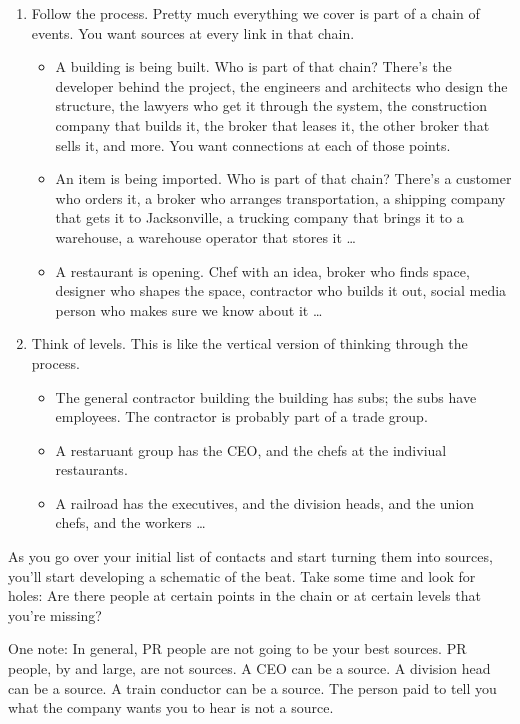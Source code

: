 \documentclass[
  11pt,
  american,
  letterpaperpaper,
  extrafontsizes,onecolumn,openright
  ]{memoir}
\providecommand{\tightlist}{%
  \setlength{\itemsep}{0pt}\setlength{\parskip}{0pt}}
\begin{document}
\begin{enumerate}
\def\labelenumi{\arabic{enumi}.}
\tightlist
\item
  Follow the process. Pretty much everything we cover is part of a chain of events. You want sources at every link in that chain.

  \begin{itemize}
  \tightlist
  \item
    A building is being built. Who is part of that chain? There's the developer behind the project, the engineers and architects who design the structure, the lawyers who get it through the system, the construction company that builds it, the broker that leases it, the other broker that sells it, and more. You want connections at each of those points.
  \item
    An item is being imported. Who is part of that chain? There's a customer who orders it, a broker who arranges transportation, a shipping company that gets it to Jacksonville, a trucking company that brings it to a warehouse, a warehouse operator that stores it \ldots{}
  \item
    A restaurant is opening. Chef with an idea, broker who finds space, designer who shapes the space, contractor who builds it out, social media person who makes sure we know about it \ldots{}
  \end{itemize}
\item
  Think of levels. This is like the vertical version of thinking through the process.

  \begin{itemize}
  \tightlist
  \item
    The general contractor building the building has subs; the subs have employees. The contractor is probably part of a trade group.
  \item
    A restaruant group has the CEO, and the chefs at the indiviual restaurants.
  \item
    A railroad has the executives, and the division heads, and the union chefs, and the workers \ldots{}
  \end{itemize}
\end{enumerate}

As you go over your initial list of contacts and start turning them into sources, you'll start developing a schematic of the beat. Take some time and look for holes: Are there people at certain points in the chain or at certain levels that you're missing?

One note: In general, PR people are not going to be your best sources. PR people, by and large, are not sources. A CEO can be a source. A division head can be a source. A train conductor can be a source. The person paid to tell you what the company wants you to hear is not a source.
\end{document}
